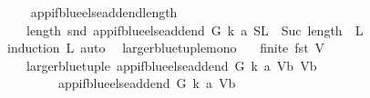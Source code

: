 \begin{isabellebody}
\endisatagproof
{\isafoldproof}%
%
\isadelimproof
\ \ \isanewline
%
\endisadelimproof
\isanewline
\isanewline
\isanewline
{}\isamarkupfalse%
\ app{\isacharunderscore}{\kern0pt}if{\isacharunderscore}{\kern0pt}blue{\isacharunderscore}{\kern0pt}else{\isacharunderscore}{\kern0pt}add{\isacharunderscore}{\kern0pt}end{\isacharunderscore}{\kern0pt}length{\isacharcolon}{\kern0pt}\isanewline
\ \ \ {\isachardoublequoteopen}length\ {\isacharparenleft}{\kern0pt}snd\ {\isacharparenleft}{\kern0pt}app{\isacharunderscore}{\kern0pt}if{\isacharunderscore}{\kern0pt}blue{\isacharunderscore}{\kern0pt}else{\isacharunderscore}{\kern0pt}add{\isacharunderscore}{\kern0pt}end\ G\ k\ a\ {\isacharparenleft}{\kern0pt}S{\isacharcomma}{\kern0pt}L{\isacharparenright}{\kern0pt}{\isacharparenright}{\kern0pt}{\isacharparenright}{\kern0pt}\ {\isacharequal}{\kern0pt}\ Suc\ {\isacharparenleft}{\kern0pt}length\ \ L{\isacharparenright}{\kern0pt}{\isachardoublequoteclose}\isanewline
%
\isadelimproof
%
\endisadelimproof
%
\isatagproof
{}\isamarkupfalse%
{\isacharparenleft}{\kern0pt}induction\ L{\isacharcomma}{\kern0pt}\ auto{\isacharparenright}{\kern0pt}\ \isamarkupfalse%
%
\endisatagproof
{\isafoldproof}%
%
\isadelimproof
%
\endisadelimproof
%
\isadelimdocument
%
\endisadelimdocument
%
\isatagdocument
%
\isamarkuptrue%
%
\endisatagdocument
{\isafolddocument}%
%
\isadelimdocument
%
\endisadelimdocument
{}\isamarkupfalse%
\ larger{\isacharunderscore}{\kern0pt}blue{\isacharunderscore}{\kern0pt}tuple{\isacharunderscore}{\kern0pt}mono{\isacharcolon}{\kern0pt}\isanewline
\ \ \ {\isachardoublequoteopen}finite\ {\isacharparenleft}{\kern0pt}fst\ V{\isacharparenright}{\kern0pt}{\isachardoublequoteclose}\isanewline
\ \ \ {\isachardoublequoteopen}larger{\isacharunderscore}{\kern0pt}blue{\isacharunderscore}{\kern0pt}tuple\ {\isacharparenleft}{\kern0pt}{\isacharparenleft}{\kern0pt}app{\isacharunderscore}{\kern0pt}if{\isacharunderscore}{\kern0pt}blue{\isacharunderscore}{\kern0pt}else{\isacharunderscore}{\kern0pt}add{\isacharunderscore}{\kern0pt}end\ G\ k\ a\ V{\isacharparenright}{\kern0pt}{\isacharcomma}{\kern0pt}b{\isacharparenright}{\kern0pt}\ {\isacharparenleft}{\kern0pt}V{\isacharcomma}{\kern0pt}b{\isacharparenright}{\kern0pt}\isanewline
\ \ \ \ \ \ \ {\isacharequal}{\kern0pt}\ {\isacharparenleft}{\kern0pt}{\isacharparenleft}{\kern0pt}app{\isacharunderscore}{\kern0pt}if{\isacharunderscore}{\kern0pt}blue{\isacharunderscore}{\kern0pt}else{\isacharunderscore}{\kern0pt}add{\isacharunderscore}{\kern0pt}end\ G\ k\ a\ V{\isacharparenright}{\kern0pt}{\isacharcomma}{\kern0pt}b{\isacharparenright}{\kern0pt}{\isachardoublequoteclose}\ \isanewline

\end{isabellebody}
